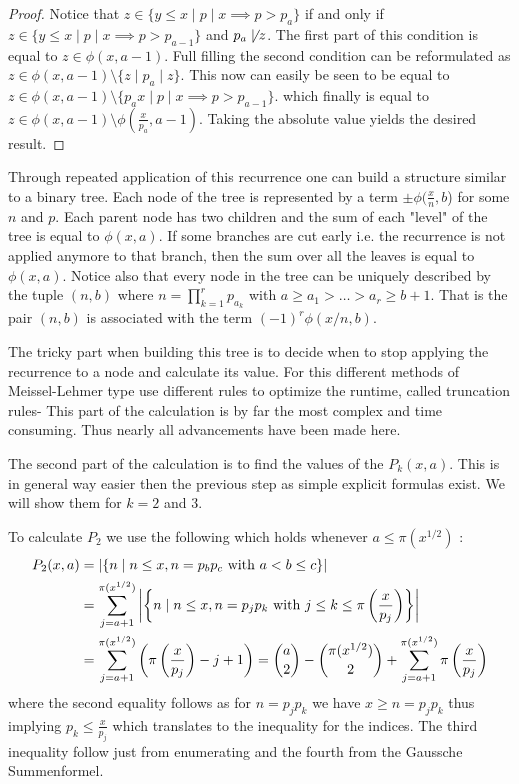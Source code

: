 \begin{proof}
	Notice that $z \in \{y \leq x \mid p \mid x \implies p > p_{a}\} $ if and only if
	$z \in \{y \leq x \mid p \mid x \implies p > p_{a-1}\} $ and $p_{a} \not\mid z$.
	The first part of this condition is equal to $z \in \phi(x,a-1)$. Full filling the second condition can be reformulated as
	$z \in \phi(x,a-1) \setminus \{z \mid p_{a} \mid z\} $. This now can easily be seen to be equal to 
	 $z \in \phi(x,a-1) \setminus \{p_{a} x \mid p \mid x \implies p > p_{a-1}\}$.
	 which finally is equal to $z \in \phi(x,a-1) \setminus \phi(\frac{x}{p_{a}}, a-1)$. Taking the absolute value yields the desired result.
\end{proof}

Through repeated application of this recurrence one can  build a structure similar to a binary tree.
Each node of the tree is represented by a term $\pm \phi(\frac{x}{n},b$) for some $n$ and $p$. 
Each parent node has two children and the sum of each "level" of the tree
is equal to $\phi(x,a)$. If some branches are cut early i.e. the recurrence is not applied anymore to that branch, then the sum over all the leaves is equal to $\phi(x,a)$.
Notice also that every node in the tree can be uniquely described by the tuple $(n,b)$ where $n = \prod_{k=1}^{r} p_{a_{k}}$ with 
$a \geq a_1 > \ldots > a_{r} \geq b +1$. That is the pair $(n,b)$ is associated with the term $(-1)^{r} \phi(x / n , b)$.

The tricky part when building this tree is to decide when to stop applying the recurrence to a node and calculate its value.
For this different methods of Meissel-Lehmer type use different rules to optimize the runtime, called truncation rules-
This part of the calculation is by far the most complex and time consuming. Thus nearly all advancements have been made here.

The second part of the calculation is to find the values of the $P_{k}(x,a)$.
This is in general way easier then the previous step as simple explicit formulas exist.
We will show them for $k=2$ and $3$.

To calculate $P_2$ we use the following which holds whenever $a \leq \pi(x^{1 / 2})$ :
\begin{align}
	P_2(x,a) &= \abs{\{n \mid n \leq x, n = p_{b} p_{c} \text{ with } a < b \leq c\} }\\
			 &=  \sum_{j=a+1}^{\pi(x^{1 / 2})} \abs{\left\{ n \mid n \leq x, n = p_{j} p_{k} \text{ with } j \leq k \leq \pi\left( \frac{x}{p_{j}} \right)  \right\} } \\
			 &= \sum_{j = a+1}^{\pi(x^{1 / 2})} \left( \pi\left(\frac{x}{p_{j}}\right) -j + 1 \right)  =
			 \binom{a}{2} - \binom{\pi(x^{1/ 2})}{2} + \sum_{j=a+1}^{\pi(x^{1 / 2})} \pi\left( \frac{x}{p_{j}} \right)
\end{align}
where the second equality follows as for $n = p_{j} p_{k}$ we have $x \geq n = p_{j} p_{k}$ thus implying $p_{k} \leq \frac{x}{p_{j}}$
which translates to the inequality for the indices.
The third inequality follow just from enumerating and the fourth from the Gaussche Summenformel.

